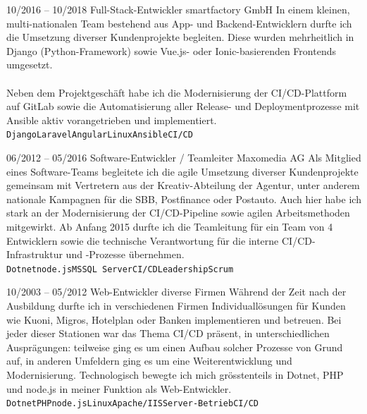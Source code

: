 \documentclass[10pt]{developercv} %
\begin{document}
\begin{entrylist}
	\entry
	{\footnotesize 10/2016 -- 10/2018}
	{Full-Stack-Entwickler}
	{smartfactory GmbH}
	{In einem kleinen, multi-nationalen Team bestehend aus App- und Backend-Entwicklern durfte ich die Umsetzung diverser Kundenprojekte begleiten. Diese wurden mehrheitlich in Django (Python-Framework) sowie Vue.js- oder Ionic-basierenden Frontends umgesetzt.\\ \\ Neben dem Projektgeschäft habe ich die Modernisierung der CI/CD-Plattform auf GitLab sowie die Automatisierung aller Release- und Deploymentprozesse mit Ansible aktiv vorangetrieben und implementiert.\\ \small \texttt{Django}\slashsep\texttt{Laravel}\slashsep\texttt{Angular}\slashsep\texttt{Linux}\slashsep\texttt{Ansible}\slashsep\texttt{CI/CD}}

	\entry
	{\footnotesize 06/2012 -- 05/2016}
	{Software-Entwickler / Teamleiter}
	{Maxomedia AG}
	{Als Mitglied eines Software-Teams begleitete ich die agile Umsetzung diverser Kundenprojekte gemeinsam mit Vertretern aus der Kreativ-Abteilung der Agentur, unter anderem nationale Kampagnen für die SBB, Postfinance oder Postauto. Auch hier habe ich stark an der Modernisierung der CI/CD-Pipeline sowie agilen Arbeitsmethoden mitgewirkt. Ab Anfang 2015 durfte ich die Teamleitung für ein Team von 4 Entwicklern sowie die technische Verantwortung für die interne CI/CD-Infrastruktur und -Prozesse übernehmen.\\ \small \texttt{Dotnet}\slashsep\texttt{node.js}\slashsep\texttt{MSSQL Server}\slashsep\texttt{CI/CD}\slashsep\texttt{Leadership}\slashsep\texttt{Scrum}}

	\entry
	{\footnotesize 10/2003 -- 05/2012}
	{Web-Entwickler}
	{diverse Firmen}
	{Während der Zeit nach der Ausbildung durfte ich in verschiedenen Firmen Individuallösungen für Kunden wie Kuoni, Migros, Hotelplan oder Banken implementieren und betreuen. Bei jeder dieser Stationen war das Thema CI/CD präsent, in unterschiedlichen Ausprägungen: teilweise ging es um einen Aufbau solcher Prozesse von Grund auf, in anderen Umfeldern ging es um eine Weiterentwicklung und Modernisierung. Technologisch bewegte ich mich grösstenteils in Dotnet, PHP und node.js in meiner Funktion als Web-Entwickler.\\ \small \texttt{Dotnet}\slashsep\texttt{PHP}\slashsep\texttt{node.js}\slashsep\texttt{Linux}\slashsep\texttt{Apache/IIS}\slashsep\texttt{Server-Betrieb}\slashsep\texttt{CI/CD}}

\end{entrylist}
\end{document}
